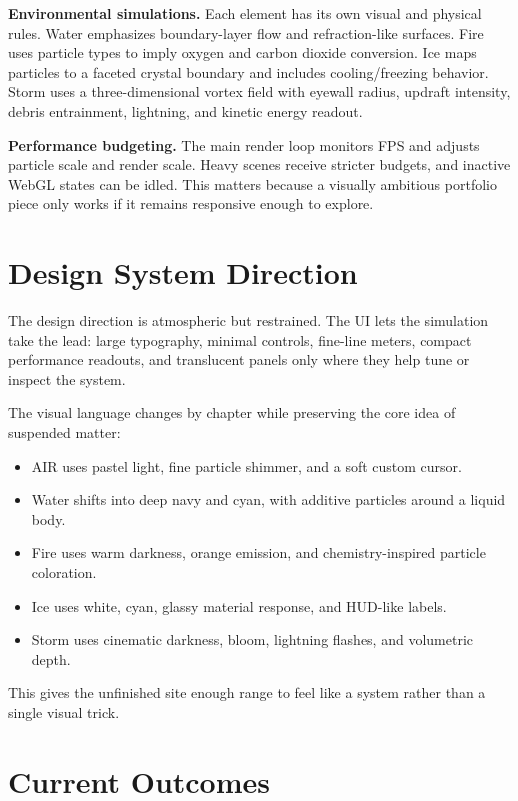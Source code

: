 \documentclass[11pt,a4paper]{article}
\newcommand{\sectionrule}{\vspace{0.2em}{\color{AirLine}\hrule height 0.8pt}\vspace{0.8em}}
\begin{document}
\textbf{Environmental simulations.} Each element has its own visual and physical rules. Water emphasizes boundary-layer flow and refraction-like surfaces. Fire uses particle types to imply oxygen and carbon dioxide conversion. Ice maps particles to a faceted crystal boundary and includes cooling/freezing behavior. Storm uses a three-dimensional vortex field with eyewall radius, updraft intensity, debris entrainment, lightning, and kinetic energy readout.

\textbf{Performance budgeting.} The main render loop monitors FPS and adjusts particle scale and render scale. Heavy scenes receive stricter budgets, and inactive WebGL states can be idled. This matters because a visually ambitious portfolio piece only works if it remains responsive enough to explore.

\section*{Design System Direction}
\sectionrule

The design direction is atmospheric but restrained. The UI lets the simulation take the lead: large typography, minimal controls, fine-line meters, compact performance readouts, and translucent panels only where they help tune or inspect the system.

The visual language changes by chapter while preserving the core idea of suspended matter:

\begin{itemize}
  \item AIR uses pastel light, fine particle shimmer, and a soft custom cursor.
  \item Water shifts into deep navy and cyan, with additive particles around a liquid body.
  \item Fire uses warm darkness, orange emission, and chemistry-inspired particle coloration.
  \item Ice uses white, cyan, glassy material response, and HUD-like labels.
  \item Storm uses cinematic darkness, bloom, lightning flashes, and volumetric depth.
\end{itemize}

This gives the unfinished site enough range to feel like a system rather than a single visual trick.

\section*{Current Outcomes}
\sectionrule
\end{document}
